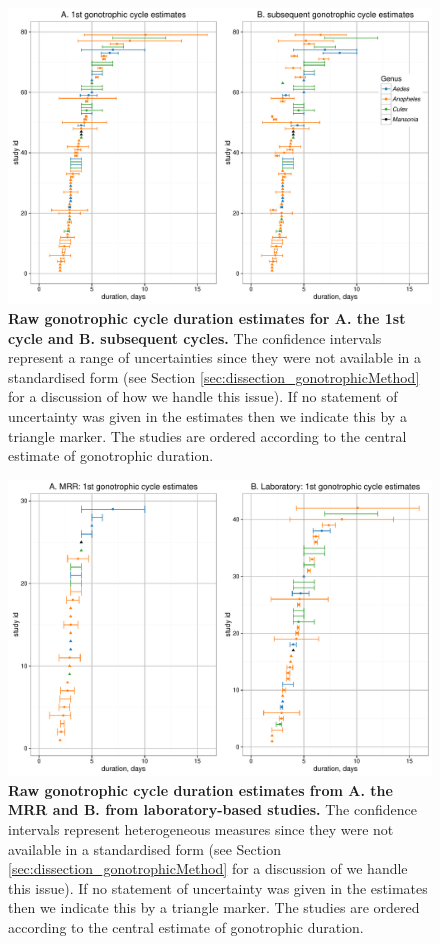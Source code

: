 \documentclass[12pt]{article}
\begin{document}
\begin{figure}[ht]
	\centerline{\includegraphics[width=1\textwidth]{./Figure_files/dissection_gonotrophicCycleRaw.pdf}}
	\caption{\textbf{Raw gonotrophic cycle duration estimates for A. the 1st cycle and B. subsequent cycles.} The confidence intervals represent a range of uncertainties since they were not available in a standardised form (see Section \ref{sec:dissection_gonotrophicMethod} for a discussion of how we handle this issue). If no statement of uncertainty was given in the estimates then we indicate this by a triangle marker. The studies are ordered according to the central estimate of gonotrophic duration.}\label{fig:dissection_gonotrophicCycleRaw}
\end{figure}

\begin{figure}[ht]
	\centerline{\includegraphics[width=1\textwidth]{./Figure_files/dissection_gonotrophicCycleRaw_MRRVsLab.pdf}}
	\caption{\textbf{Raw gonotrophic cycle duration estimates from A. the MRR and B. from laboratory-based studies.} The confidence intervals represent heterogeneous measures since they were not available in a standardised form (see Section \ref{sec:dissection_gonotrophicMethod} for a discussion of we handle this issue). If no statement of uncertainty was given in the estimates then we indicate this by a triangle marker. The studies are ordered according to the central estimate of gonotrophic duration.}\label{fig:dissection_gonotrophicCycleRaw_MRRVsLab}
\end{figure}
\end{document}
